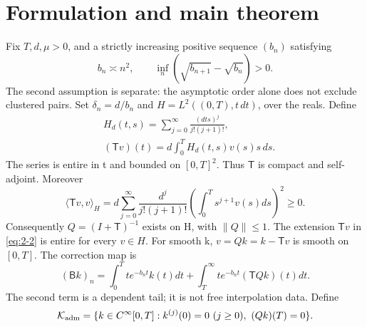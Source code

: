 \section{Formulation and main theorem}\label{sec:formulation}
Fix \(T,d,\mu>0\), and a strictly increasing positive sequence \((b_n)\) satisfying
\begin{equation}\label{eq:2-1}
b_n\asymp n^2,\qquad \inf_n(\sqrt{b_{n+1}}-\sqrt{b_n})>0.
\end{equation}
The second assumption is separate: the asymptotic order alone does not exclude clustered pairs. Set \(\delta_n=d/b_n\) and \(H=L^2((0,T),t\,dt)\), over the reals. Define
\begin{equation}\label{eq:2-2}
\begin{aligned}
&H_d(t,s)=\sum_{j=0}^\infty\frac{(dts)^j}{j!(j+1)!},\\
&
(\mathsf Tv)(t)=d\int_0^T H_d(t,s)v(s)s\,ds.
\end{aligned}
\end{equation}
The series is entire in t and bounded on \([0,T]^2\). Thus \(\mathsf T\) is compact and self-adjoint. Moreover
\begin{equation}\label{eq:2-3}
\langle\mathsf Tv,v\rangle_H=d\sum_{j=0}^\infty\frac{d^j}{j!(j+1)!}\left(\int_0^T s^{j+1}v(s)ds\right)^2\ge0.
\end{equation}
Consequently \(Q=(I+\mathsf T)^{-1}\) exists on H, with \(\|Q\|\le1\). The extension \(\mathsf Tv\) in \eqref{eq:2-2} is entire for every \(v\in H\). For smooth k, \(v=Qk=k-\mathsf Tv\) is smooth on \([0,T]\). The correction map is
\begin{equation}\label{eq:2-4}
(\mathsf Bk)_n=\int_0^T t e^{-b_nt}k(t)dt+
\int_T^\infty t e^{-b_nt}(\mathsf TQk)(t)dt.
\end{equation}
The second term is a dependent tail; it is not free interpolation data. Define
\begin{equation}\label{eq:2-5}
\mathcal K_{\rm adm}=\{k\in C^\infty[0,T]:k^{(j)}(0)=0\ (j\ge0),\ (Qk)(T)=0\}.
\end{equation}
